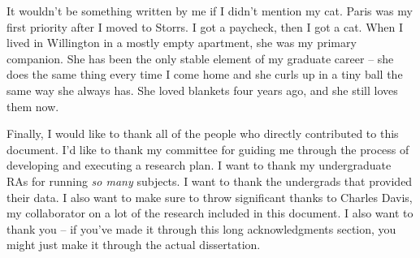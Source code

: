 \documentclass[../dissertation.tex]{subfiles}
\begin{document}
	It wouldn't be something written by me if I didn't mention my cat. Paris was my first priority after I moved to Storrs. I got a paycheck, then I got a cat. When I lived in Willington in a mostly empty apartment, she was my primary companion. She has been the only stable element of my graduate career -- she does the same thing every time I come home and she curls up in a tiny ball the same way she always has. She loved blankets four years ago, and she still loves them now. \par 
	Finally, I would like to thank all of the people who directly contributed to this document. I'd like to thank my committee for guiding me through the process of developing and executing a research plan. I want to thank my undergraduate RAs for running \textit{so many} subjects. I want to thank the undergrads that provided their data. I also want to make sure to throw significant thanks to Charles Davis, my collaborator on a lot of the research included in this document. I also want to thank you -- if you've made it through this long acknowledgments section, you might just make it through the actual dissertation.
\end{document}
